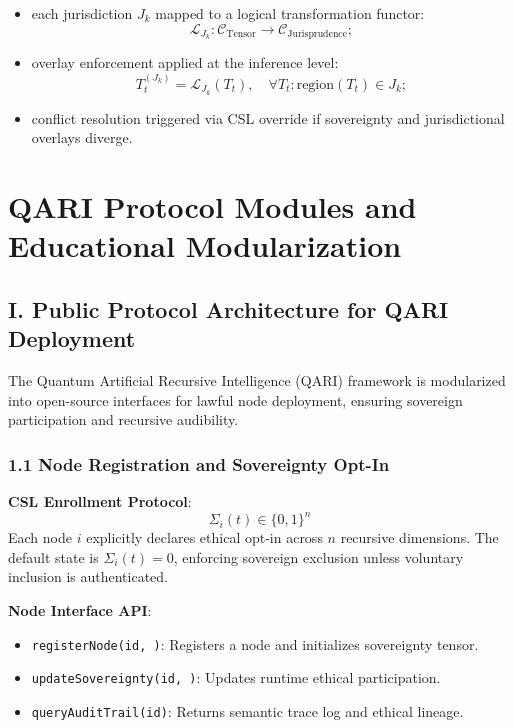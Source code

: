 \documentclass[12pt]{article}
\begin{document}
\begin{itemize}
    \item each jurisdiction \( J_k \) mapped to a logical transformation functor:
    \[
    \mathcal{L}_{J_k} : \mathcal{C}_{\text{Tensor}} \rightarrow \mathcal{C}_{\text{Jurisprudence}};
    \]

    \item overlay enforcement applied at the inference level:
    \[
    T_t^{(J_k)} = \mathcal{L}_{J_k}(T_t), \quad \forall T_t : \text{region}(T_t) \in J_k;
    \]

    \item conflict resolution triggered via CSL override if sovereignty and jurisdictional overlays diverge.
\end{itemize}






\section{QARI Protocol Modules and Educational Modularization}

\subsection{I. Public Protocol Architecture for QARI Deployment}

The Quantum Artificial Recursive Intelligence (QARI) framework is modularized into open-source interfaces for lawful node deployment, ensuring sovereign participation and recursive audibility.

\subsubsection{1.1 Node Registration and Sovereignty Opt-In}

\textbf{CSL Enrollment Protocol}:
\begin{equation}
\Sigma_i(t) \in \{0,1\}^n
\end{equation}
Each node $i$ explicitly declares ethical opt-in across $n$ recursive dimensions. The default state is $\Sigma_i(t) = 0$, enforcing sovereign exclusion unless voluntary inclusion is authenticated.

\textbf{Node Interface API}:
\begin{itemize}
    \item \texttt{registerNode(id, \Sigma)}: Registers a node and initializes sovereignty tensor.
    \item \texttt{updateSovereignty(id, \Sigma)}: Updates runtime ethical participation.
    \item \texttt{queryAuditTrail(id)}: Returns semantic trace log and ethical lineage.
\end{itemize}
\end{document}

